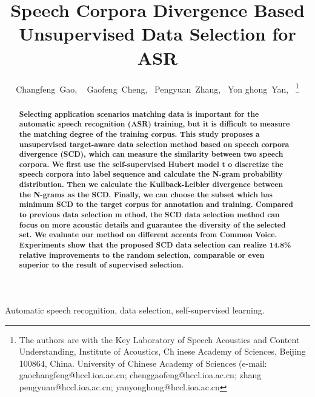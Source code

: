
\importpackages{}
\graphicspath{ {./images/} }

\title{Speech Corpora Divergence Based Unsupervised Data Selection for ASR}
\author{Changfeng~Gao,
~
        Gaofeng~Cheng,~
        Pengyuan~Zhang,~
        Yon
ghong~Yan,~
\thanks{The authors are with the Key Laboratory of Speech Acoustics and Content Understanding, Institute of Acoustics, Ch
inese Academy of Sciences,
Beijing 100864, China. University of Chinese Academy of Sciences (e-mail: gaochangfeng@hccl.ioa.ac.cn;  chenggaofeng@hccl.ioa.ac.cn; zhang
pengyuan@hccl.ioa.ac.cn; yanyonghong@hccl.ioa.ac.cn}
}
\maketitle
\begin{abstract}
\textbf{
Selecting application scenarios matching data is important for the automatic 
speech recognition (ASR) training, but it is difficult to measure the matching degree of the training corpus.
This study proposes a unsupervised target-aware data selection method based on speech corpora divergence (SCD),
which can measure the similarity between two speech corpora.
We first use the self-supervised Hubert model t o discretize the speech corpora into label sequence and calculate the N-gram probability distribution. 
Then we calculate the Kullback-Leibler divergence between the N-grams as the SCD.
Finally, we can choose the subset which has minimum SCD to the target corpus for annotation and training.
Compared to previous data selection m
ethod, the SCD data selection method can focus on more acoustic details and guarantee the diversity of the selected set.
We evaluate our method on different accents 
from Common Voice. Experiments show that the proposed SCD data selection can realize 14.8\% relative improvements to the random selection, 
comparable or even superior to the result of supervised selection.}
\end{abstract}
\begin{IEEEkeywords}
Automatic speech recognition, data selection, self-supervised learning.
\end{IEEEkeywords}
